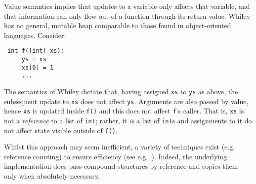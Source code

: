 Value semantics implies that updates to a variable only affects that
variable, and that information can only flow out of a function through
its return value.  Whiley has no general, mutable heap comparable to
those found in object-oriented languages.  Consider:
\begin{lstlisting}
 int f([int] xs):
     ys = xs
     xs[0] = 1
     ...
\end{lstlisting}
The semantics of Whiley dictate that, having assigned \lstinline{xs}
to \lstinline{ys} as above, the subsequent update to \lstinline{xs}
does not affect \lstinline{ys}.  Arguments are also passed by value,
hence \lstinline{xs} is updated inside \lstinline{f()} and this does
not affect \lstinline{f}'s caller.  That is, \lstinline{xs} is not a
{\em reference} to a list of \lstinline{int}; rather, it {\em is} a
list of \lstinline{int}s and assignments to it do not affect state
visible outside of \lstinline{f()}. 

Whilst this approach may seem inefficient, a variety of techniques
exist (e.g. reference counting) to ensure efficiency (see
e.g.~\cite{LH11,Shank01,Ode91}).  Indeed, the underlying
implementation does pass compound structures by reference and copies
them only when absolutely necessary.


